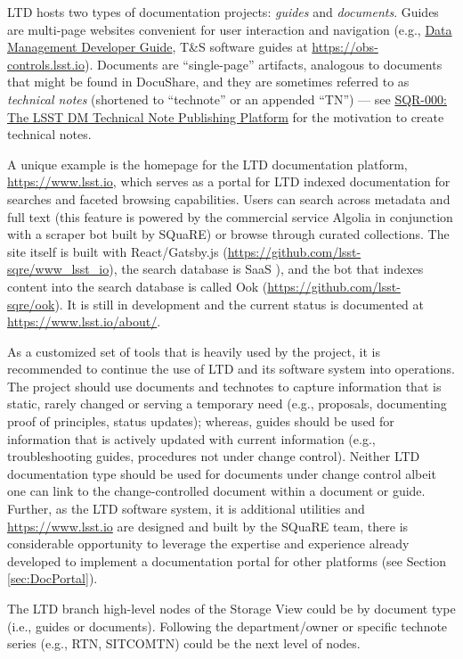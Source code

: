 LTD hosts two types of documentation projects: \emph{guides} and \emph{documents}.
Guides are multi-page websites convenient for user interaction and navigation (e.g., \href{developer.lsst.io}{Data Management Developer Guide}, T\&S software guides at \url{https://obs-controls.lsst.io}).
Documents are ``single-page'' artifacts, analogous to documents that might be found in DocuShare, and they are sometimes referred to as \emph{technical notes} (shortened to ``technote'' or an appended ``TN'') --- see \href{https://sqr-000.lsst.io}{SQR-000: The LSST DM Technical Note Publishing Platform} for the motivation to create technical notes. 

A unique example is the homepage for the LTD documentation platform, \url{https://www.lsst.io}, which serves as a portal for LTD indexed documentation for searches and faceted browsing capabilities. \citep{lsst.io-cite}
Users can search across metadata and full text (this feature is powered by the commercial service Algolia \citep{Algolia-cite} in conjunction with a scraper bot built by SQuaRE) or browse through curated collections.
The site itself is built with React/Gatsby.js (\url{https://github.com/lsst-sqre/www_lsst_io}), the search database is SaaS \citep{SaaS-cite}), and the bot that indexes content into the search database is called Ook (\url{https://github.com/lsst-sqre/ook}).
It is still in development and the current status is documented at \url{https://www.lsst.io/about/}.

As a customized set of tools that is heavily used by the project, it is recommended to continue the use of LTD and its software system into operations.
The project should use documents and technotes to capture information that is static, rarely changed or serving a temporary need (e.g., proposals, documenting proof of principles, status updates);
whereas, guides should be used for information that is actively updated with current information (e.g., troubleshooting guides, procedures not under change control).
Neither LTD documentation type should be used for documents under change control albeit one can link to the change-controlled document within a document or guide.
Further, as the LTD software system, it is additional utilities and \url{https://www.lsst.io} are designed and built by the SQuaRE team, there is considerable opportunity to leverage the expertise and experience already developed to implement a documentation portal for other platforms (see Section \ref{sec:DocPortal}).

The LTD branch high-level nodes of the Storage View could be by document type (i.e., guides or documents).
Following the department/owner or specific technote series (e.g., RTN, SITCOMTN) could be the next level of nodes.

